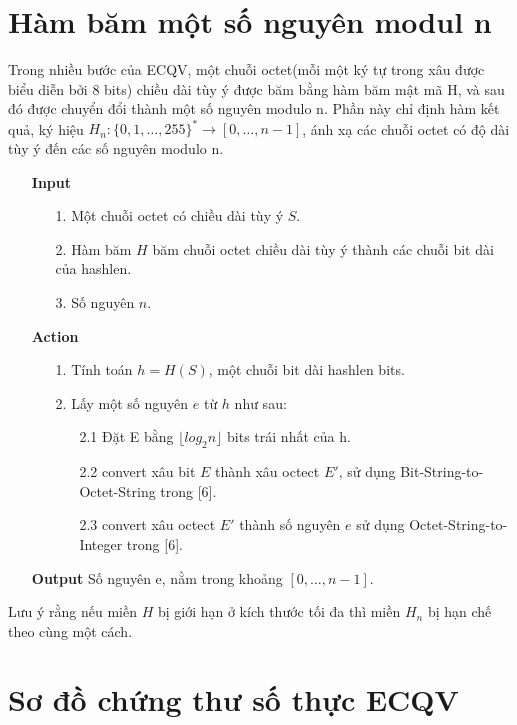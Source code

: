 \documentclass[a4paper,12pt]{report}
\begin{document}
\section{Hàm băm một số nguyên modul n}
Trong nhiều bước của ECQV, một chuỗi octet(mỗi một ký tự trong xâu được biểu diễn bởi 8 bits) chiều dài tùy ý được băm bằng hàm băm mật mã H, và sau đó được chuyển đổi thành một số nguyên modulo n. Phần này chỉ định hàm kết quả, ký hiệu $H_n: \{0, 1,\ldots , 255\}^{*} \rightarrow [0,\ldots , n - 1]$, ánh xạ các chuỗi octet có độ dài tùy ý đến các số nguyên modulo n.
\begin{itemize}
\item[] \textbf{Input}
\begin{itemize}
\item[1. ] Một chuỗi octet có chiều dài tùy ý $S$.
\item[2. ] Hàm băm $H$ băm chuỗi octet chiều dài tùy ý thành các chuỗi bit dài của hashlen.
\item[3. ] Số nguyên $n$.
\end{itemize}
\item[] \textbf{Action}
\begin{itemize}
\item[1. ] Tính toán $h = H(S)$, một chuỗi bit dài hashlen bits.
\item[2. ] Lấy một số nguyên $e$ từ $h$ như sau:
\begin{itemize}
\item[2.1 ] Đặt E bằng $\lfloor log_2{n} \rfloor$ bits trái nhất của h.
\item[2.2 ] convert xâu bit $E$ thành xâu octect $E'$, sử dụng  Bit-String-to-Octet-String trong [6].
\item[2.3 ] convert xâu octect $E'$ thành số nguyên $e$ sử dụng Octet-String-to-Integer trong [6].
\end{itemize}
\end{itemize}
\item[] \textbf{Output} Số nguyên e, nằm trong khoảng $[0,\ldots , n - 1]$.
\end{itemize}
Lưu ý rằng nếu miền $H$ bị giới hạn ở kích thước tối đa thì miền $H_n$ bị hạn chế theo cùng một cách. 
\section{Sơ đồ chứng thư số thực ECQV}
\end{document}
